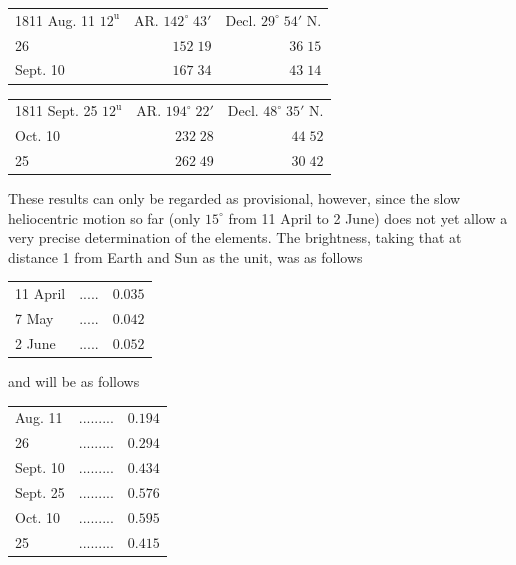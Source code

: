 \begin{center}\fontsize{10}{12}\selectfont\setlength{\tabcolsep}{4pt}\renewcommand{\arraystretch}{1.15}\begin{tabular}{lrr}
1811 Aug. 11 $12^{\text{u}}$ & AR. $142^\circ\;43'$ & Decl. $29^\circ\;54'$ N.\\
26 & $152\;19$ & $36\;15$\\
Sept. 10 & $167\;34$ & $43\;14$\\
\end{tabular}\end{center}

\begin{center}\fontsize{10}{12}\selectfont\setlength{\tabcolsep}{4pt}\renewcommand{\arraystretch}{1.15}\begin{tabular}{lrr}
1811 Sept. 25 $12^{\text{u}}$ & AR. $194^\circ\;22'$ & Decl. $48^\circ\;35'$ N.\\
Oct. 10 & $232\;28$ & $44\;52$\\
25 & $262\;49$ & $30\;42$\\
\end{tabular}\end{center}

\par\indent These results can only be regarded as provisional, however, since the slow heliocentric motion so far (only $15^\circ$ from 11 April to 2 June) does not yet allow a very precise determination of the elements. The brightness, taking that at distance 1 from Earth and Sun as the unit, was as follows

\begin{center}\fontsize{10}{12}\selectfont\setlength{\tabcolsep}{4pt}\renewcommand{\arraystretch}{1.15}\begin{tabular}{llr}
11 April & .\;.\;.\;.\;. & $0.035$\\
7 May & .\;.\;.\;.\;. & $0.042$\\
2 June & .\;.\;.\;.\;. & $0.052$\\
\end{tabular}\end{center}

\noindent and will be as follows

\begin{center}\fontsize{10}{12}\selectfont\setlength{\tabcolsep}{4pt}\renewcommand{\arraystretch}{1.15}\begin{tabular}{llr}
Aug. 11 & .\;.\;.\;.\;.\;.\;.\;.\;. & $0.194$\\
26 & .\;.\;.\;.\;.\;.\;.\;.\;. & $0.294$\\
Sept. 10 & .\;.\;.\;.\;.\;.\;.\;.\;. & $0.434$\\
Sept. 25 & .\;.\;.\;.\;.\;.\;.\;.\;. & $0.576$\\
Oct. 10 & .\;.\;.\;.\;.\;.\;.\;.\;. & $0.595$\\
25 & .\;.\;.\;.\;.\;.\;.\;.\;. & $0.415$\\
\end{tabular}\end{center}

